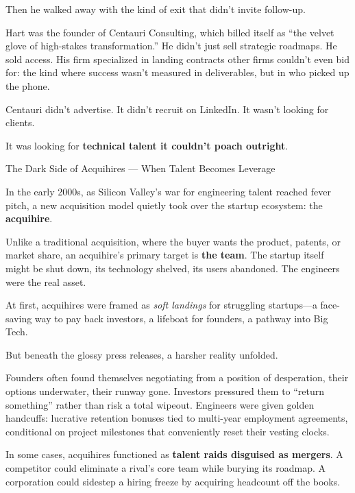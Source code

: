 Then he walked away with the kind of exit that didn’t invite follow-up.

Hart was the founder of Centauri Consulting, which billed itself as “the velvet glove of high-stakes transformation.” 
He didn’t just sell strategic roadmaps. He sold access. His firm specialized in landing contracts other firms 
couldn’t even bid for: the kind where success wasn’t measured in deliverables, but in who picked up the phone.

Centauri didn’t advertise. It didn’t recruit on LinkedIn. It wasn’t looking for clients.

It was looking for \textbf{technical talent it couldn’t poach outright}.


\medskip

\begin{HistoricalSidebar}{The Dark Side of Acquihires --- When Talent Becomes Leverage}

  In the early 2000s, as Silicon Valley’s war for engineering talent reached fever pitch, a new acquisition model 
  quietly took over the startup ecosystem: the \textbf{acquihire}.

  \medskip
  
  Unlike a traditional acquisition, where the buyer wants the product, patents, or market share, an acquihire’s primary 
  target is \textbf{the team}. The startup itself might be shut down, its technology shelved, its users abandoned. The 
  engineers were the real asset.

  \medskip
  
  At first, acquihires were framed as \textit{soft landings} for struggling startups—a face-saving way to pay back 
  investors, a lifeboat for founders, a pathway into Big Tech.

  \medskip
  
  But beneath the glossy press releases, a harsher reality unfolded.

  \medskip
  
  Founders often found themselves negotiating from a position of desperation, their options underwater, their runway gone. 
  Investors pressured them to “return something” rather than risk a total wipeout. Engineers were given golden handcuffs: 
  lucrative retention bonuses tied to multi-year employment agreements, conditional on project milestones that conveniently 
  reset their vesting clocks.

  \medskip
  
  In some cases, acquihires functioned as \textbf{talent raids disguised as mergers}. A competitor could eliminate a rival’s 
  core team while burying its roadmap. A corporation could sidestep a hiring freeze by acquiring headcount off the books.


\end{HistoricalSidebar}

